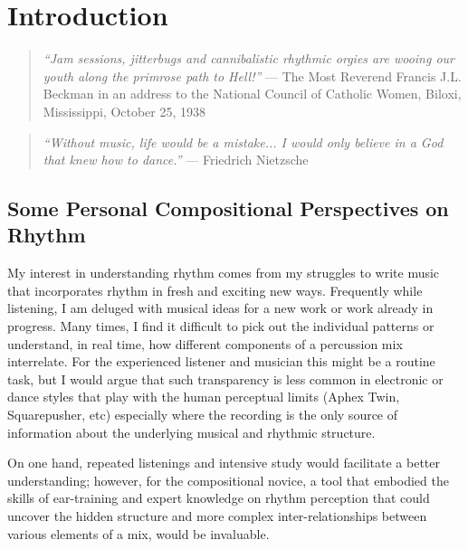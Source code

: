 \chapter{Introduction}

\vspace{10mm}

\begin{quote}
  {\it   
  ``Jam sessions, jitterbugs and cannibalistic rhythmic orgies are
  wooing our youth along the primrose path to Hell!''} --- The Most
  Reverend Francis J.L. Beckman in an address to the National Council
  of Catholic Women, Biloxi, Mississippi, October 25, 1938
\end{quote}

\begin{quote}
  {\it   
    ``Without music, life would be a mistake... I would only believe in a
  God that knew how to dance.''} --- Friedrich Nietzsche
\end{quote}


\vspace{7mm}
\section{Some Personal Compositional Perspectives on Rhythm}
\vspace{5mm}


My interest in understanding rhythm comes from my struggles 
to write music that incorporates rhythm in fresh 
and exciting new ways.  Frequently while listening, 
I am deluged with musical ideas for a new work or work 
already in progress.  Many times, I find it difficult 
to pick out the individual patterns or understand, in real 
time, how different components of a percussion mix interrelate.  
For the experienced listener and musician this might be a 
routine task, but I would argue that such transparency is 
less common in electronic or dance styles that play with the 
human perceptual limits (Aphex Twin, Squarepusher, etc) especially 
where the recording is the only source of information about the 
underlying musical and rhythmic structure. 


On one hand, repeated listenings and intensive study would facilitate 
a better understanding; however, for the compositional 
novice, a tool that embodied the skills of ear-training and expert 
knowledge on rhythm perception that could uncover the hidden 
structure and more complex inter-relationships between various 
elements of a mix, would be invaluable. 

